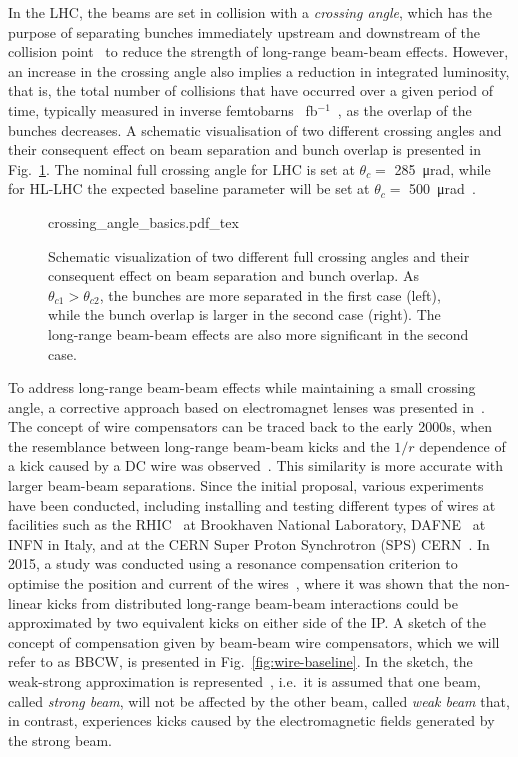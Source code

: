 In the LHC, the beams are set in collision with a \textit{crossing angle}, which has the purpose of separating bunches immediately upstream and downstream of the collision point~\cite{Arduini_2016} to reduce the strength of long-range beam-beam effects. However, an increase in the crossing angle also implies a reduction in integrated luminosity, that is, the total number of collisions that have occurred over a given period of time, typically measured in inverse femtobarns \SI{}{fb}$^{-1}$~\cite{Herr:941318}, as the overlap of the bunches decreases. A schematic visualisation of two different crossing angles and their consequent effect on beam separation and bunch overlap is presented in Fig.~\ref{fig:crossing-angles}. The nominal full crossing angle for LHC is set at $\theta_c =$ \SI{285}{\micro\radian}, while for HL-LHC the expected baseline parameter will be set at $\theta_c =$ \SI{500}{\micro\radian}~\cite{BejarAlonso:2749422}. 

\begin{figure}[th]
    \centering
    \def\svgwidth{1.0\textwidth}
    {crossing_angle_basics.pdf_tex}
    \caption{Schematic visualization of two different full crossing angles and their consequent effect on beam separation and bunch overlap. As $\theta_{c1} > \theta_{c2}$, the bunches are more separated in the first case (left), while the bunch overlap is larger in the second case (right). The long-range beam-beam effects are also more significant in the second case.}
    \label{fig:crossing-angles}
\end{figure}

To address long-range beam-beam effects while maintaining a small crossing angle, a corrective approach based on electromagnet lenses was presented in~\cite{Koutchouk:692058}. The concept of wire compensators can be traced back to the early 2000s, when the resemblance between long-range beam-beam kicks and the $1/r$ dependence of a kick caused by a DC wire was observed~\cite{PhysRevSTAB.5.074001, Koutchouk:692058}. This similarity is more accurate with larger beam-beam separations. Since the initial proposal, various experiments have been conducted, including installing and testing different types of wires at facilities such as the RHIC~\cite{PhysRevSTAB.14.091001} at Brookhaven National Laboratory, DAFNE~\cite{https://doi.org/10.48550/arxiv.0803.1544} at INFN in Italy, and at the CERN Super Proton Synchrotron (SPS) CERN~\cite{Zimmermann:1955353,Koutchouk:793423}. In 2015, a study was conducted using a resonance compensation criterion to optimise the position and current of the wires~\cite{Fartoukh:2052448}, where it was shown that the non-linear kicks from distributed long-range beam-beam interactions could be approximated by two equivalent kicks on either side of the IP. A sketch of the concept of compensation given by beam-beam wire compensators, which we will refer to as BBCW, is presented in Fig.~\ref{fig:wire-baseline}. In the sketch, the weak-strong approximation is represented~\cite{Pellegrini_2017,Banfi:1742126}, i.e.\ it is assumed that one beam, called \textit{strong beam}, will not be affected by the other beam, called \textit{weak beam} that, in contrast, experiences kicks caused by the electromagnetic fields generated by the strong beam.

